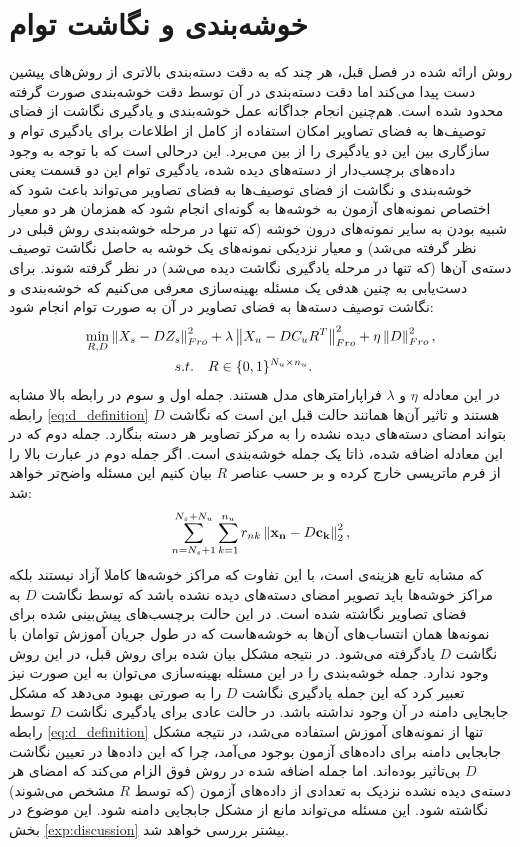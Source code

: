 \section{خوشه‌بندی و نگاشت توام} \label{jeac}
روش ارائه شده در فصل قبل، هر چند که به دقت دسته‌بندی بالاتری از روش‌های پیشین دست پیدا می‌کند اما دقت دسته‌بندی در آن توسط دقت خوشه‌بندی صورت گرفته محدود شده است. هم‌چنین انجام جداگانه عمل خوشه‌بندی و یادگیری نگاشت از فضای توصیف‌ها به فضای تصاویر امکان استفاده از کامل از اطلاعات برای یادگیری توام و سازگاری بین این دو یادگیری را از بین می‌برد. این درحالی است که با توجه به وجود داده‌های برچسب‌دار از دسته‌های دیده شده، یادگیری توام این دو قسمت یعنی خوشه‌بندی و نگاشت از فضای توصیف‌ها به فضای تصاویر می‌تواند باعث شود که اختصاص نمونه‌های آزمون به خوشه‌ها به گونه‌ای انجام شود که همزمان هر دو معیار شبیه بودن به سایر نمونه‌های درون خوشه (که تنها در مرحله خوشه‌بندی روش قبلی در نظر گرفته می‌شد) و معیار نزدیکی نمونه‌های یک خوشه به حاصل نگاشت توصیف دسته‌ی آن‌ها (که تنها در مرحله یادگیری نگاشت دیده می‌شد) در نظر گرفته شوند.
 برای دست‌یابی به چنین هدفی یک مسئله بهینه‌سازی معرفی می‌کنیم که خوشه‌بندی و نگاشت توصیف دسته‌ها به فضای تصاویر در آن به صورت توام انجام شود:
\begin{align}
\label{eq:joint}
 \min_{R,D} \left \lVert X_s - D Z_s \right \rVert_{Fro}^2  &+ \lambda \left \lVert X_u - D C_u R^T  \right \rVert_{Fro}^2 + \eta \left \lVert D \right \rVert_{Fro}^2, \\
   s.t. \quad & R \in \{0,1\}^{N_u \times n_u}. \nonumber
\end{align}
در این معادله $\eta$ و $\lambda$ فراپارامترهای مدل هستند. جمله اول و سوم در رابطه بالا مشابه رابطه \eqref{eq:d_definition} هستند و تاثیر آن‌ها همانند حالت قبل این است که نگاشت $D$ بتواند امضای دسته‌های دیده نشده را به مرکز تصاویر هر دسته بنگارد. جمله دوم که در این معادله اضافه شده، ذاتا یک جمله خوشه‌بندی است. اگر جمله دوم در عبارت بالا را از فرم ماتریسی خارج کرده و بر حسب عناصر $R$ بیان کنیم این مسئله واضح‌تر  خواهد شد:
\begin{equation}
\label{eq:essentialy_clustering}
\sum_{n=N_s+1}^{N_s + N_u} \sum_{k=1}^{n_u} r_{nk} \left \lVert \mathbf{x_n} - D \mathbf{c_k} \right \rVert_2^2,
\end{equation}
که مشابه تابع هزینه‌ی
است، با این تفاوت که مراکز خوشه‌ها کاملا آزاد نیستند بلکه مراکز خوشه‌ها باید تصویر امضای دسته‌های دیده نشده باشد که توسط نگاشت $D$ به فضای تصاویر نگاشته شده است. در این حالت برچسب‌های پیش‌بینی شده برای نمونه‌ها همان انتساب‌های آن‌ها به خوشه‌هاست که در طول جریان آموزش توامان با نگاشت $D$ یادگرفته می‌شود. در نتیجه مشکل بیان شده برای روش قبل، در این روش وجود ندارد. جمله خوشه‌بندی را در این مسئله بهینه‌سازی می‌توان به این صورت نیز تعبیر کرد که این جمله یادگیری نگاشت $D$ را به صورتی بهبود می‌دهد که مشکل جابجایی دامنه در آن وجود نداشته باشد. در حالت عادی برای یادگیری نگاشت $D$ توسط رابطه
\eqref{eq:d_definition}
تنها از نمونه‌های آموزش استفاده می‌شد، در نتیجه مشکل جابجایی دامنه برای داده‌های آزمون بوجود می‌آمد، چرا که این داده‌ها در تعیین نگاشت $D$ بی‌تاثیر بوده‌اند. اما جمله اضافه شده در روش فوق الزام می‌کند که امضای هر دسته‌ی دیده نشده نزدیک به تعدادی از داده‌های آزمون (که توسط $R$ مشخص می‌شوند) نگاشته شود. این مسئله می‌تواند مانع از مشکل جابجایی دامنه شود. این موضوع در بخش
\ref{exp:discussion}
بیشتر بررسی خواهد شد.
